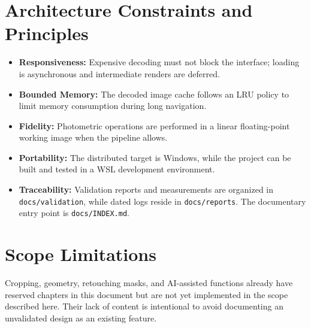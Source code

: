 \section{Architecture Constraints and Principles}

\begin{itemize}
  \item \textbf{Responsiveness:} Expensive decoding must not block the interface; loading is asynchronous and intermediate renders are deferred.
  \item \textbf{Bounded Memory:} The decoded image cache follows an LRU policy to limit memory consumption during long navigation.
  \item \textbf{Fidelity:} Photometric operations are performed in a linear floating-point working image when the pipeline allows.
  \item \textbf{Portability:} The distributed target is Windows, while the project can be built and tested in a WSL development environment.
  \item \textbf{Traceability:} Validation reports and measurements are organized in \texttt{docs/validation}, while dated logs reside in \texttt{docs/reports}. The documentary entry point is \texttt{docs/INDEX.md}.
\end{itemize}

\section{Scope Limitations}

Cropping, geometry, retouching masks, and AI-assisted functions already have reserved chapters in this document but are not yet implemented in the scope described here. Their lack of content is intentional to avoid documenting an unvalidated design as an existing feature.
